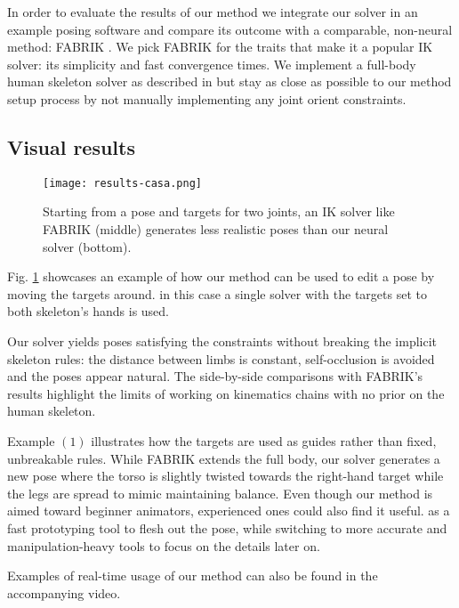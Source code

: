 
In order to evaluate the results of our method we integrate our solver in an example posing software and compare its outcome with a comparable, non-neural method: FABRIK \cite{aristidou_fabrik:_2011}. We pick FABRIK for the traits that make it a popular IK solver: its simplicity and fast convergence times. We implement a full-body human skeleton solver as described in \cite{aristidou_extending_2016} but stay as close as possible to our method setup process by not manually implementing any joint orient constraints.

\subsection{Visual results}
\begin{figure}[h]
    \centering
    \texttt{[image: results-casa.png]}
    \caption{Starting from a pose and targets for two joints, an IK solver like FABRIK (middle) generates less realistic poses than our neural solver (bottom).}
    \label{fig:results-hands}
    \vspace{-15pt}
\end{figure}

Fig. \ref{fig:results-hands} showcases an example of how our method can be used to edit a pose by moving the targets around. in this case a single solver with the targets set to both skeleton's hands is used.

Our solver yields poses satisfying the constraints without breaking the implicit skeleton rules: the distance between limbs is constant, self-occlusion is avoided and the poses appear natural.
The side-by-side comparisons with FABRIK's results highlight the limits of working on kinematics chains with no prior on the human skeleton.

Example $(1)$ illustrates how the targets are used as guides rather than fixed, unbreakable rules. While FABRIK extends the full body, our solver generates a new pose where the torso is slightly twisted towards the right-hand target while the legs are spread to mimic maintaining balance.
Even though our method is aimed toward beginner animators, experienced ones could also find it useful.  as a fast prototyping tool to flesh out the pose, while switching to more accurate and manipulation-heavy tools to focus on the details later on.

Examples of real-time usage of our method can also be found in the accompanying video.

